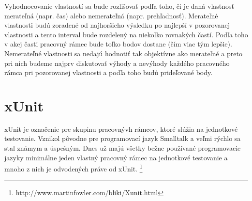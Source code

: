 \documentclass[11pt,twoside,slovak,a4paper]{article}
\begin{document}
	Vyhodnocovanie vlastností sa bude rozlišovať podľa toho, či je daná vlastnosť merateľná (napr. čas) alebo nemerateľná (napr. prehľadnosť). 
	Merateľné vlastnosti budú zoradené od najhoršieho výsledku po najlepší v pozorovanej vlastnosti a tento interval bude rozdelený na niekoľko rovnakých častí. Podľa toho v akej časti pracovný rámec bude toľko bodov dostane (čím viac tým lepšie). 
	Nemerateľné vlastnosti sa nedajú hodnotiť tak objektívne ako merateľné a preto pri nich budeme najprv diskutovať výhody a nevýhody každého pracovného rámca pri pozorovanej vlastnosti a podľa toho budú prideľované body.
	
	\newpage
	\thispagestyle{plain}
	\section{xUnit}
		xUnit je označenie pre skupinu pracovnývh rámcov, ktoré slúžia na jednotkové testovanie. Vznikol pôvodne pre programovací jazyk Smalltalk a veľmi rýchlo sa stal známym a úspešným. Dnes už majú všetky bežne používané programovacie jazyky minimálne jeden vlastný pracovný rámec na jednotkové testovanie a mnoho z nich je odvodených práve od xUnit. 		\footnote{http://www.martinfowler.com/bliki/Xunit.html} \newline
\end{document}
